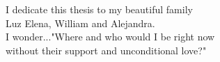\newpage
\begin{center}
    \vspace*{\fill}
    I dedicate this thesis to my beautiful family\\ Luz Elena, William and Alejandra.\\
    \vspace{5cm}
    I wonder..."Where and who would I be right now\\
    without their support and unconditional love?"
    \vspace*{\fill}
\end{center}